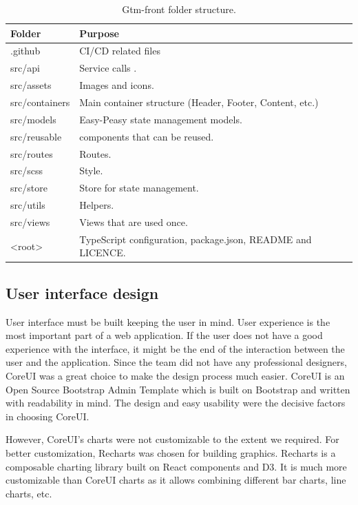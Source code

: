 \begin{table}[h]
    \centering
    \begin{tabular}{ | p{3cm} | p{10cm} |}
        \hline
        \textbf{Folder} & \textbf{Purpose}\\
        \hline
        .github & CI/CD related files\\
        \hline
        src/api & Service calls .\\
        \hline
        src/assets & Images and icons. \\
        \hline
        src/containers & Main container structure (Header, Footer, Content, etc.)\\
        \hline
        src/models & Easy-Peasy state management models.\\
        \hline
        src/reusable & components that can be reused.\\
        \hline
        src/routes & Routes.\\
        \hline
        src/scss & Style.\\
        \hline
        src/store & Store for state management.\\
        \hline
        src/utils & Helpers.\\
        \hline
        src/views & Views that are used once.\\
        \hline
        <root> & TypeScript configuration, package.json, README and LICENCE.\\
        \hline
    \end{tabular}
    \caption{Gtm-front folder structure.}
    \label{tab:gtm-front-folder-structure}
\end{table}

\subsection{User interface design}\label{subsec:user-interface-design}
User interface must be built keeping the user in mind.
User experience is the most important part of a web application.
If the user does not have a good experience with the interface, it might be the end of the interaction between the user and the application.
Since the team did not have any professional designers, CoreUI was a great choice to make the design process much easier.
CoreUI is an Open Source Bootstrap Admin Template which is built on Bootstrap and written with readability in mind.
The design and easy usability were the decisive factors in choosing CoreUI.

However, CoreUI's charts were not customizable to the extent we required.
For better customization, Recharts was chosen for building graphics.
Recharts is a composable charting library built on React components and D3.
It is much more customizable than CoreUI charts as it allows combining different bar charts, line charts, etc.
\cite{recharts-readme}

